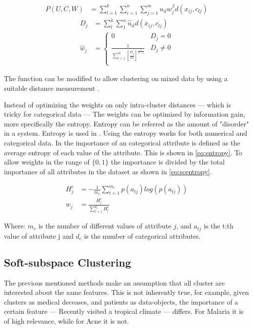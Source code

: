 \documentclass[../report.tex]{subfiles}
\begin{document}
\begin{align}
  \label{eq:cost_w_weight}
  P(U,C,W) &= \sum^k_{l=1} \sum^n_{i=1} \sum^m_{j=1} u_{il} w_j^{\beta} d(x_{ij},c_{lj})
\end{align}
\begin{align}
D_j &= \sum^{ k }_{ l }{\sum^n_1 {\hat{u}_{il} d(x_{ ij }, c_ { lj } )}} \\
\label{eq:optimW}
\hat{w}_j &=
\begin{cases}
  0 & D_j = 0 \\
  \frac{1}{ \sum^m_{t=1} [\frac{ D_j }{ D_t }]^{ \frac{ 1 }{ \beta - 1 } } } & D_j \neq 0 \\
\end{cases}
\end{align}

The function can be modified to allow clustering on mixed data by using a suitable distance measurement \cite{Jia2018}.

Instead of optimizing the weights on only intra-cluster distances --- which is tricky for categorical data --- The weights can be optimized by information gain, more specifically the entropy. Entropy can be referred as the amount of "disorder" in a system. Entropy is used in \cite{Cheung2013, Jing2007}. Using the entropy works for both numerical and categorical data. In \cite{Cheung2013} the importance of an categorical attribute is defined as the average entropy of each value of the attribute. This is shown in \ref{eq:entropy}. To allow weights in the range of $\{0,1\}$ the importance is divided by the total importance of all attributes in the dataset as shown in \ref{eq:scentropy}.

\begin{align}
  H_j^c & =  - \frac{1}{m_r} \sum^{m_r}_{t = 1}{p(a_{tj}) log(p(a_{tj}))} 
\label{eq:entropy} \\
  w_j & = \frac{H_j^c}{\sum_{t = 1}^{d_c}{H_t^c}}
  \label{eq:scentropy}
\end{align}

Where:
${m_r}$ is the number of different values of attribute $j$, and $a_{tj}$ is the t:th value of attribute j and $d_c$ is the number of categorical attributes.

\subsection{Soft-subspace Clustering}

The previous mentioned methods make an assumption that all cluster are interested about the same features. This is not inherently true, for example, given clusters as medical deceases, and patients as data-objects, the importance of a certain feature --- Recently visited a tropical climate --- differs. For Malaria it is of high relevance, while for Acne it is not.
\end{document}
